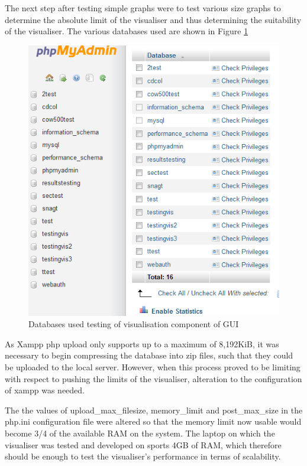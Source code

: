 The next step after testing simple graphs were to test various size graphs to determine the absolute limit of the visualiser and thus determining the suitability of the visualiser. The various databases used are shown in Figure \ref{fig:phpmyadmin}

\begin{figure}[htbp]%
\includegraphics[width=\columnwidth]{./img/phpmyadmin}%
\caption{Databases used testing of visualisation component of GUI}%
\label{fig:phpmyadmin}%
\end{figure}

As Xampp php upload only supports up to a maximum of 8,192KiB, it was necessary to begin compressing the database into zip files, such that they could be uploaded to the local server. However, when this process proved to be limiting with respect to pushing the limits of the visualiser, alteration to the configuration of xampp was needed. 

The the values of upload\_max\_filesize, memory\_limit and post\_max\_size in the php.ini configuration file were altered so that the memory limit now usable would become 3/4 of the available RAM on the system. The laptop on which the visualiser was tested and developed on sports 4GB of RAM, which therefore should be enough to test the visualiser's performance in terms of scalability. 

